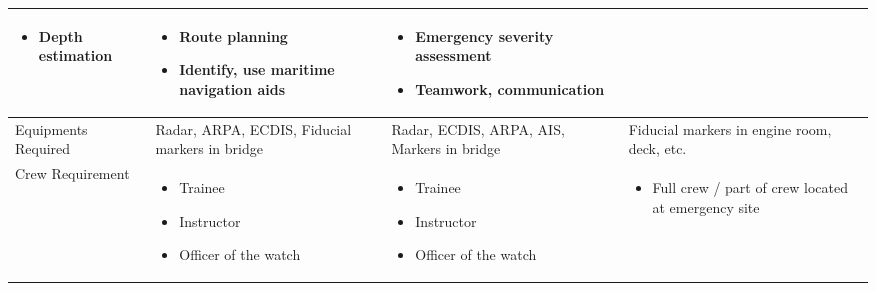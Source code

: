 \begin{table}
\begin{tabular}{@{}p{2.3cm}|p{3.4cm}|p{3.4cm}|p{3.4cm}|@{}}
\begin{itemize}[leftmargin=*,topsep=0pt,partopsep=0pt,align=left,itemsep=0cm]
\item Depth estimation  
\end{itemize}
\vspace{-\baselineskip}
& \vspace{-2mm}\begin{itemize}[leftmargin=*,topsep=0pt,partopsep=0pt,align=left,itemsep=0cm]
\renewcommand{\labelitemi}{\tiny\listsymb} 
\item Route planning
\item Identify, use maritime navigation aids
\end{itemize}
\vspace{-\baselineskip}
& \vspace{-2mm}\begin{itemize}[leftmargin=*,topsep=0pt,partopsep=0pt,align=left,itemsep=0cm]
\renewcommand{\labelitemi}{\tiny\listsymb} 
\item Emergency severity assessment 
\item Teamwork, communication 
\end{itemize} \vspace{-\baselineskip} \\
\hline
Equipments Required & Radar, ARPA, ECDIS, Fiducial markers in bridge & Radar, ECDIS, ARPA, AIS, Markers in bridge & Fiducial markers in engine room, deck, etc. \\
\hline
Crew Requirement & 
\vspace{-2mm} \begin{itemize}[leftmargin=*,topsep=0pt,partopsep=0pt,align=left,itemsep=0cm]
\renewcommand{\labelitemi}{\tiny\listsymb} 
\item Trainee 
\item Instructor
\item Officer of the watch
\end{itemize}
&\vspace{-2mm} \begin{itemize}[leftmargin=*,topsep=0pt,partopsep=0pt,align=left,itemsep=0cm]
\renewcommand{\labelitemi}{\tiny\listsymb} 
\item Trainee 
\item Instructor
\item Officer of the watch
\end{itemize}
& \vspace{-2mm} \begin{itemize}[nosep,leftmargin=*,topsep=0pt,partopsep=0pt,align=left,itemsep=0cm]
\renewcommand{\labelitemi}{\tiny\listsymb} 
\item Full crew / part of crew located at emergency site
\end{itemize} \vspace{-\baselineskip} \\
\bottomrule
\end{tabular}
\end{table}


